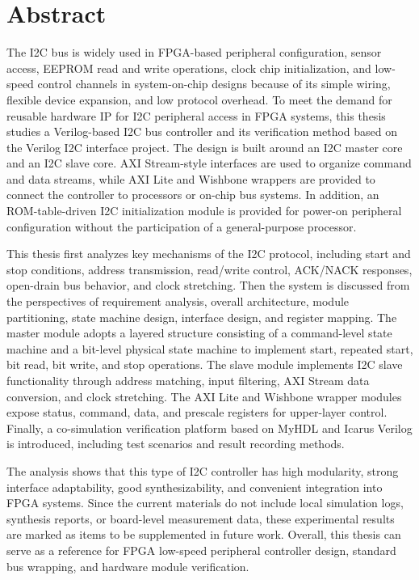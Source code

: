 \section{Abstract}\label{abstract}

The I2C bus is widely used in FPGA-based peripheral configuration,
sensor access, EEPROM read and write operations, clock chip
initialization, and low-speed control channels in system-on-chip designs
because of its simple wiring, flexible device expansion, and low
protocol overhead. To meet the demand for reusable hardware IP for I2C
peripheral access in FPGA systems, this thesis studies a Verilog-based
I2C bus controller and its verification method based on the Verilog I2C
interface project. The design is built around an I2C master core and an
I2C slave core. AXI Stream-style interfaces are used to organize command
and data streams, while AXI Lite and Wishbone wrappers are provided to
connect the controller to processors or on-chip bus systems. In
addition, an ROM-table-driven I2C initialization module is provided for
power-on peripheral configuration without the participation of a
general-purpose processor.

This thesis first analyzes key mechanisms of the I2C protocol, including
start and stop conditions, address transmission, read/write control,
ACK/NACK responses, open-drain bus behavior, and clock stretching. Then
the system is discussed from the perspectives of requirement analysis,
overall architecture, module partitioning, state machine design,
interface design, and register mapping. The master module adopts a
layered structure consisting of a command-level state machine and a
bit-level physical state machine to implement start, repeated start, bit
read, bit write, and stop operations. The slave module implements I2C
slave functionality through address matching, input filtering, AXI
Stream data conversion, and clock stretching. The AXI Lite and Wishbone
wrapper modules expose status, command, data, and prescale registers for
upper-layer control. Finally, a co-simulation verification platform
based on MyHDL and Icarus Verilog is introduced, including test
scenarios and result recording methods.

The analysis shows that this type of I2C controller has high modularity,
strong interface adaptability, good synthesizability, and convenient
integration into FPGA systems. Since the current materials do not
include local simulation logs, synthesis reports, or board-level
measurement data, these experimental results are marked as items to be
supplemented in future work. Overall, this thesis can serve as a
reference for FPGA low-speed peripheral controller design, standard bus
wrapping, and hardware module verification.

